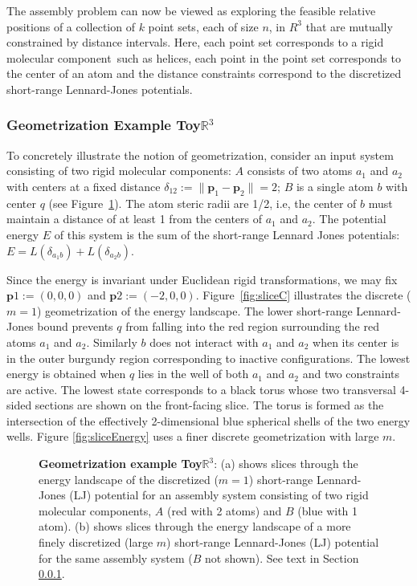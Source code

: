 \documentclass[]{article}
\newcommand{\figref}[1]{Figure~\ref{#1}}
\newcommand{\dst}{\delta}  \newcommand{\dlo}{\underline{\dst}}
\newcommand{\rmc}{rigid molecular component}
\newcommand{\toythreed}{Toy$\mathbb{R}^3$}
\newcommand{\bp}{\mathbf{p}}
\begin{document}
The assembly problem can now be viewed as exploring the feasible relative
positions of a collection of $k$ point sets, each of size $n$, in $R^3$
that are mutually constrained by distance intervals. Here, each point set
corresponds to a \rmc\ such as helices, each point in the
point set corresponds to the center of an atom and the distance
constraints correspond to the discretized short-range Lennard-Jones potentials.

\subsubsection{Geometrization Example \toythreed}
\label{sec:geometrizationExample}
To concretely illustrate the notion of geometrization, consider an input system
consisting of two rigid molecular components: $A$ consists of two atoms $a_1$ and $a_2$
with centers at a fixed distance $\dst_{12} := \|\bp_1-\bp_2\| = 2$; $B$ is a
single atom $b$ with center $q$ (see \figref{fig:geometrizationExample}). 
The atom steric radii are 1/2, i.e, the
center of $b$ must maintain a distance of at least 1 from the centers of
$a_1$ and $a_2$. The potential energy $E$ of this system is the sum of the
short-range Lennard Jones potentials: $E = L(\dst_{a_1b}) + L(\dst_{a_2b})$. 

Since the energy is invariant under Euclidean rigid transformations,
we may fix $\bp1 := (0, 0, 0)$ and $\bp2 := (-2, 0, 0)$. \figref{fig:sliceC}
illustrates the discrete ($m=1$) geometrization of the energy
landscape. The lower short-range Lennard-Jones bound prevents $q$ from falling into the red region
surrounding the red atoms $a_1$ and $a_2$. Similarly $b$ does not interact
with $a_1$ and $a_2$ when its center is in the outer burgundy region
corresponding to inactive configurations. The lowest energy is obtained when
$q$ lies in the well of both $a_1$ and $a_2$ and two constraints are active.
The lowest state corresponds to a
black torus whose two transversal 4-sided sections are shown on the
front-facing slice. The torus is formed as the intersection of the effectively
2-dimensional blue spherical shells of the two energy wells. 
Figure \ref{fig:sliceEnergy} uses a finer discrete geometrization with large $m$.

\begin{figure}[htpb]
\centering
{}
\caption{\scriptsize \textbf{Geometrization example \toythreed}: 
(a) shows slices through the energy landscape of the discretized ($m=1$) short-range Lennard-Jones
(LJ) potential for an assembly system consisting of two \rmc s, $A$ (red with 2
atoms) and $B$ (blue with 1 atom).  
(b) shows slices through the energy landscape of a more finely 
discretized (large $m$) short-range Lennard-Jones
(LJ) potential for the same assembly system ($B$ not shown).
See text in Section \ref{sec:geometrizationExample}.
}
\label{fig:geometrizationExample}
\end{figure}
\end{document}
